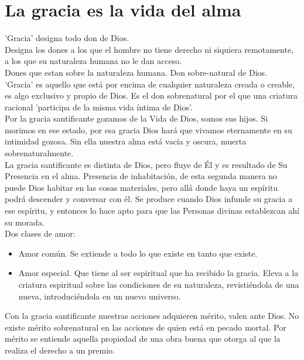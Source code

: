 \documentclass{article}
\begin{document}
    \section*{La gracia es la vida del alma}
       'Gracia' designa todo don de Dios.\\
       Designa los dones a los que el hombre no tiene derecho ni siquiera remotamente, a los que su naturaleza humana no le dan acceso.\\  
       Dones que estan sobre la naturaleza humana. Don sobre-natural de Dios.\\
       'Gracia' es aquello que está por encima de cualquier naturaleza creada o creable, es algo exclusivo y propio de Dios. Es el don sobrenatural por el que una criatura racional 'participa de la misma vida íntima de Dios'.\\
       Por la gracia santificante gozamos de la Vida de Dios, somos sus hijos. Si morimos en ese estado, por esa gracia Dios hará que vivamos eternamente en su intimidad gozosa. Sin ella nuestra alma está vacía y oscura, muerta sobrenaturalmente.\\
       La gracia santificante es distinta de Dios, pero fluye de Él y es resultado de Su Presencia en el alma.
       Presencia de inhabitación, de esta segunda manera no puede Dios habitar en las cosas materiales, pero allá donde haya un espíritu podrá descender y conversar con él.
       Se produce cuando Dios infunde su gracia a ese espíritu, y entonces lo hace apto para que las Personas divinas establezcan ahí su morada.\\

       Dos clases de amor:
       \begin{itemize}
       \item Amor común. Se extiende a todo lo que existe en tanto que existe.
       \item Amor especial. Que tiene al ser espiritual que ha recibido la gracia. Eleva a la criatura espiritual sobre las condiciones de su naturaleza, revistiéndola de una nueva, introduciéndola en un nuevo universo. 
       \end{itemize}

       Con la gracia santificante nuestras acciones adquieren mérito, valen ante Dios. No existe mérito sobrenatural en las acciones de quien está en pecado mortal.
       Por mérito se entiende aquella propiedad de una obra buena que otorga al que la realiza el derecho a un premio. 
\end{document}
